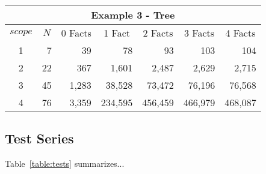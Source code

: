 \begin{singlespacing}
\begin{table}[H]
\begin{center}
        \bigskip

        \begin{tabular}{|c|r|r|r|r|r|r|}
        \hline
            \multicolumn{ 7}{|c|}{\textbf{Example 3 - Tree}} \\
        \hline
            $scope$ & \multicolumn{1}{c|}{$N$} & \multicolumn{1}{c|}{0 Facts} & \multicolumn{1}{c|}{1 Fact} & \multicolumn{1}{c|}{2 Facts} & \multicolumn{1}{c|}{3 Facts} & \multicolumn{1}{c|}{4 Facts} \\
        \hline
                1 &  7 &    39  &      78  &      93  &     103  &     104  \\
                2 & 22 &   367  &   1,601  &   2,487  &   2,629  &   2,715  \\
                3 & 45 & 1,283  &  38,528  &  73,472  &  76,196  &  76,568  \\
                4 & 76 & 3,359  & 234,595  & 456,459  & 466,979  & 468,087  \\
        \hline
        \end{tabular}
        \end{center}
    \end{table}
    \end{singlespacing}


\clearpage
\subsection{Test Series}

    Table~\vref{table:tests} summarizes...

